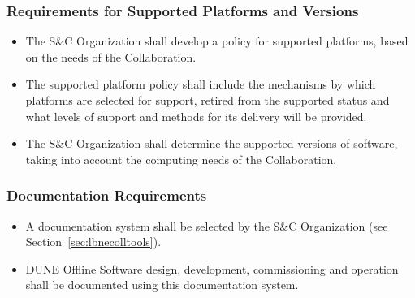 \subsubsection{Requirements for Supported Platforms and Versions}

\begin{itemize}

\item The S\&C Organization shall develop a policy for supported platforms, based on the needs of the Collaboration.  

\item The supported platform policy shall include the mechanisms by which platforms are selected for support, retired from
 the supported status and what levels of support and methods for its delivery will be provided.
 
\item The S\&C Organization shall determine the supported versions of software, taking into account the computing needs of the Collaboration.
\end{itemize}

\subsubsection{Documentation Requirements}
\begin{itemize}

\item A documentation system shall be selected by the S\&C Organization (see Section~\ref{sec:lbnecolltools}).

\item DUNE Offline Software design, development, commissioning and operation shall be documented using this documentation system.

\end{itemize}


